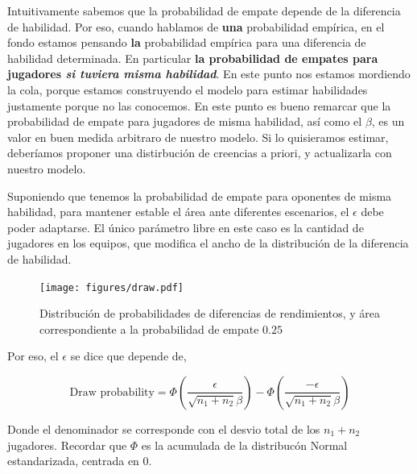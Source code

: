 \documentclass[article]{jss}
\begin{document}
Intuitivamente sabemos que la probabilidad de empate depende de la diferencia de habilidad.
Por eso, cuando hablamos de \textbf{una} probabilidad emp\'irica, en el fondo estamos pensando \textbf{la} probabilidad emp\'irica para una diferencia de habilidad determinada.
En particular \textbf{la probabilidad de empates para jugadores \emph{si tuviera misma habilidad}}.
En este punto nos estamos mordiendo la cola, porque estamos construyendo el modelo para estimar habilidades justamente porque no las conocemos.
En este punto es bueno remarcar que la probabilidad de empate para jugadores de misma habilidad, así como el $\beta$, es un valor en buen medida arbitraro de nuestro modelo.
Si lo quisieramos estimar, deberíamos proponer una distirbuci\'on de creencias a priori, y actualizarla con nuestro modelo.

\vspace{0.3cm}

Suponiendo que tenemos la probabilidad de empate para oponentes de misma habilidad, para mantener estable el \'area ante diferentes escenarios, el $\epsilon$ debe poder adaptarse.
El \'unico par\'ametro libre en este caso es la cantidad de jugadores en los equipos, que modifica el ancho de la distribuci\'on de la diferencia de habilidad.

\begin{figure}[H]
\centering
  \texttt{[image: figures/draw.pdf]}
  \caption{Distribuci\'on de probabilidades de diferencias de rendimientos, y área correspondiente a la probabilidad de empate $0.25$}
  \label{fig:draw}
\end{figure}

Por eso, el $\epsilon$ se dice que depende de, 

\begin{equation}
 \text{Draw probability} = \Phi(\frac{\epsilon}{\sqrt{n_1+n_2}\beta}) - \Phi(\frac{-\epsilon}{\sqrt{n_1+n_2}\beta})
\end{equation}

Donde el denominador se corresponde con el desvio total de los $n_1 + n_2$ jugadores.
Recordar que $\Phi$ es la acumulada de la distribuc\'on Normal estandarizada, centrada en 0. 


 
 
 
 
 
 
\end{document}
